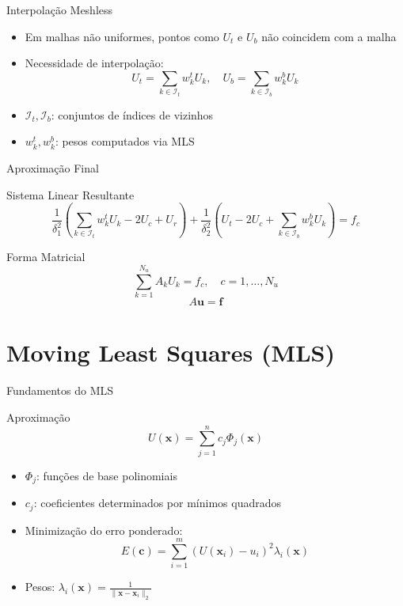 \documentclass[../main/main.tex]{subfiles}
\begin{document}
\begin{frame}{Interpolação Meshless}
\begin{itemize}
\item Em malhas não uniformes, pontos como $U_t$ e $U_b$ não coincidem com a malha
\item Necessidade de interpolação:
\[
U_t = \sum_{k \in \mathcal{I}_t} w_k^t U_k, \quad U_b = \sum_{k \in \mathcal{I}_b} w_k^b U_k
\]
\item $\mathcal{I}_t, \mathcal{I}_b$: conjuntos de índices de vizinhos
\item $w_k^t, w_k^b$: pesos computados via MLS
\end{itemize}
\end{frame}

\begin{frame}{Aproximação Final}
\begin{block}{Sistema Linear Resultante}
\[
\frac{1}{\delta_1^2}\left(\sum_{k \in \mathcal{I}_t} w_k^t U_k - 2U_c + U_r\right) + \frac{1}{\delta_2^2}\left(U_t - 2U_c + \sum_{k \in \mathcal{I}_b} w_k^b U_k\right) = f_c
\]
\end{block}

\begin{block}{Forma Matricial}
\[
\sum_{k=1}^{N_u} A_k U_k = f_c, \quad c = 1, \ldots, N_u
\]
\[
A\mathbf{u} = \mathbf{f}
\]
\end{block}
\end{frame}

\section{Moving Least Squares (MLS)}

\begin{frame}{Fundamentos do MLS}
\begin{block}{Aproximação}
\[
U(\mathbf{x}) = \sum_{j=1}^n c_j \Phi_j(\mathbf{x})
\]
\end{block}

\begin{itemize}
\item $\Phi_j$: funções de base polinomiais
\item $c_j$: coeficientes determinados por mínimos quadrados
\item Minimização do erro ponderado:
\[
E(\mathbf{c}) = \sum_{i=1}^m \left(U(\mathbf{x}_i) - u_i\right)^2 \lambda_i(\mathbf{x})
\]
\item Pesos: $\lambda_i(\mathbf{x}) = \frac{1}{\|\mathbf{x} - \mathbf{x}_i\|_2}$
\end{itemize}
\end{frame}
\end{document}
